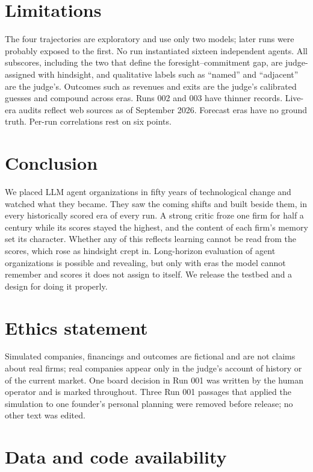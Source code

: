 \documentclass[11pt]{article}
\theoremstyle{definition}
\begin{document}
\section{Limitations}

The four trajectories are exploratory and use only two models; later runs were probably exposed to the first. No run instantiated sixteen independent agents. All subscores, including the two that define the foresight--commitment gap, are judge-assigned with hindsight, and qualitative labels such as ``named'' and ``adjacent'' are the judge's. Outcomes such as revenues and exits are the judge's calibrated guesses and compound across eras. Runs 002 and 003 have thinner records. Live-era audits reflect web sources as of September 2026. Forecast eras have no ground truth. Per-run correlations rest on six points.

\section{Conclusion}

We placed LLM agent organizations in fifty years of technological change and watched what they became. They saw the coming shifts and built beside them, in every historically scored era of every run. A strong critic froze one firm for half a century while its scores stayed the highest, and the content of each firm's memory set its character. Whether any of this reflects learning cannot be read from the scores, which rose as hindsight crept in. Long-horizon evaluation of agent organizations is possible and revealing, but only with eras the model cannot remember and scores it does not assign to itself. We release the testbed and a design for doing it properly.

\section*{Ethics statement}

Simulated companies, financings and outcomes are fictional and are not claims about real firms; real companies appear only in the judge's account of history or of the current market. One board decision in Run 001 was written by the human operator and is marked throughout. Three Run 001 passages that applied the simulation to one founder's personal planning were removed before release; no other text was edited.

\section*{Data and code availability}
\end{document}
